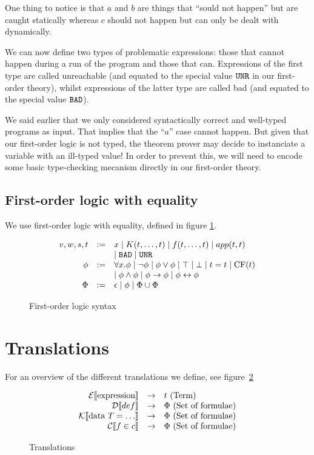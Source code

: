 \documentclass[preprint]{sigplanconf}
\begin{document}
One thing to notice is that $a$ and $b$ are things that ``sould not
happen'' but are caught statically whereas $c$ should not happen but
can only be dealt with dynamically.

We can now define two types of problematic expressions: those that
cannot happen during a run of the program and those that can.
Expressions of the first type are called unreachable (and equated to
the special value $\texttt{UNR}$ in our first-order theory), whilst
expressions of the latter type are called bad (and equated to the
special value $\texttt{BAD}$).

We said earlier that we only considered syntactically correct and
well-typed programs as input. That implies that the ``$a$'' case
cannot happen. But given that our first-order logic is not typed, the
theorem prover may decide to instanciate a variable with an ill-typed
value! In order to prevent this, we will need to encode some basic
type-checking mecanism directly in our first-order theory.


\subsection{First-order logic with equality}
We use first-order logic with equality, defined in figure \ref{fol-stx}.

\begin{figure}
 \centering
  \[  \begin{array}{rcl}
    v,w,s,t &:=& x \mid K(t,\dots,t) \mid f(t,\dots,t) \mid app(t,t)\\
    && \mid \texttt{BAD} \mid \texttt{UNR} \\
    \phi &:=& \forall x.\phi \mid \lnot \phi \mid \phi \lor \phi \mid \top \mid \bot \mid t=t \mid \mbox{CF}(t)\\
    && \mid \phi \land \phi \mid \phi \to \phi \mid \phi \leftrightarrow \phi \\
    \Phi &:=& \epsilon \mid \phi \mid \Phi \cup \Phi \\
  \end{array} \]
  \caption{First-order logic syntax}
  \label{fol-stx}
\end{figure}


\section{Translations}
For an overview of the different translations we define, see figure~\ref{trans}

\begin{figure}
 \begin{center}
  \[  \begin{array}{rcl}
    \mathcal{E} \llbracket \mbox{expression} \rrbracket &\to& t~(\mbox{Term}) \\
    \mathcal{D} \llbracket def \rrbracket &\to& \Phi~(\mbox{Set of formulae}) \\
    \mathcal{K} \llbracket \mbox{data } T = \dots \rrbracket &\to& \Phi~(\mbox{Set of formulae}) \\
    \mathcal{C} \llbracket f \in c \rrbracket &\to& \Phi~(\mbox{Set of formulae}) \\
  \end{array} \]
  \end{center}
  \caption{Translations}
  \label{trans}
\end{figure}
\end{document}
